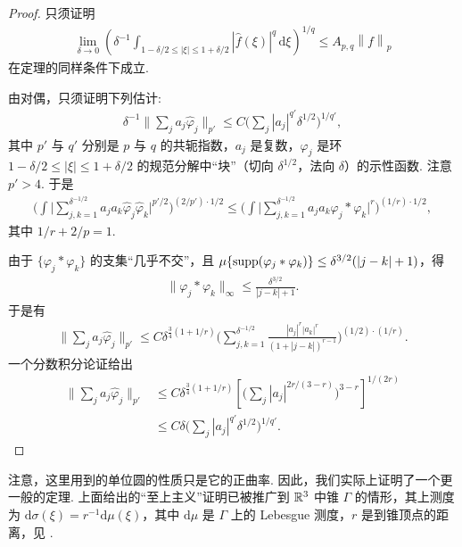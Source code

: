 \begin{proof}
只须证明
\begin{align*}
  \lim_{\delta\rightarrow 0}\left(\delta^{-1}\int_{1-\delta/2\leq|\xi|\leq 1+\delta/2}|\widehat{f}(\xi)|^{q}\,\mathrm{d}\xi\right)^{1/q}
  \leq A_{p,q}\left\|f\right\|_{p}
\end{align*}
在定理的同样条件下成立.

由对偶，只须证明下列估计:
\begin{align*}
  \delta^{-1}\Big\|\sum_{j}a_{j}\widehat{\varphi}_{j}\Big\|_{p'}
  \leq C\Big(\sum_{j}|a_{j}|^{q'}\delta^{1/2}\Big)^{1/q'},
\end{align*}
其中 $p'$ 与 $q'$ 分别是 $p$ 与 $q$ 的共轭指数，$a_j$ 是复数，$\varphi_j$ 是环 $1 - \delta/2 \leq |\xi| \leq 1 + \delta/2$ 的规范分解中``块''（切向 $\delta^{1/2}$，法向 $\delta$）的示性函数. 注意 $p' > 4$. 于是
\begin{align*}
  \Big(\int\Big|\sum_{j,k=1}^{\delta^{-1/2}}a_{j}a_{k}\widehat{\varphi}_{j}\widehat{\varphi}_{k}\Big|^{p'/2}\Big)^{(2/p')\cdot 1/2}
  \leq\Big(\int\Big|\sum_{j,k=1}^{\delta^{-1/2}}a_{j}a_{k}\varphi_{j}*\varphi_{k}\Big|^{r}\Big)^{(1/r)\cdot 1/2},
\end{align*}
其中 $1/r + 2/p = 1$.

由于 $\{\varphi_j * \varphi_k\}$ 的支集``几乎不交''，且 $\mu\{\operatorname{supp}(\varphi_j * \varphi_k)\} \leq \delta^{3/2}(|j - k| + 1)$，得
\begin{align*}
  \|\varphi_{j}*\varphi_{k}\|_{\infty}\leq\frac{\delta^{3/2}}{|j-k|+1}.
\end{align*}
于是有
\begin{align*}
  \Big\|\sum_{j}a_{j}\widehat{\varphi}_{j}\Big\|_{p'}
  \leq C\delta^{\frac{3}{4}(1+1/r)}
  \Big(\sum_{j,k=1}^{\delta^{-1/2}}\frac{|a_{j}|^{r}|a_{k}|^{r}}{(1+|j-k|)^{r-1}}\Big)^{(1/2)\cdot(1/r)}.
\end{align*}
一个分数积分论证给出
\begin{align*}
  \Big\|\sum_{j}a_{j}\widehat{\varphi}_{j}\Big\|_{p'}
  &\leq C\delta^{\frac{3}{4}(1+1/r)}\left[\Big(\sum_{j}|a_{j}|^{2r/(3-r)}\Big)^{3-r}\right]^{1/(2r)}\\
  &\leq C\delta\Big(\sum_{j}|a_{j}|^{q'}\delta^{1/2}\Big)^{1/q'}.
\end{align*}
\end{proof}

注意，这里用到的单位圆的性质只是它的正曲率. 因此，我们实际上证明了一个更一般的定理. 上面给出的``至上主义''证明已被推广到 $\mathbb{R}^3$ 中锥 $\Gamma$ 的情形，其上测度为 $\mathrm{d}\sigma(\xi) = r^{-1}\mathrm{d}\mu(\xi)$，其中 $\mathrm{d}\mu$ 是 $\Gamma$ 上的 Lebesgue 测度，$r$ 是到锥顶点的距离，见 \cite{b97}.

